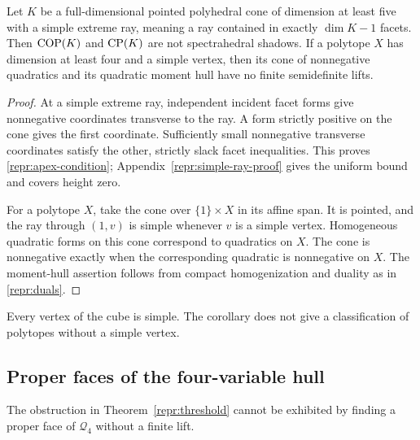 \begin{corollary}\label{repr:simple-vertex}
Let $K$ be a full-dimensional pointed polyhedral cone of dimension at least
five with a simple extreme ray, meaning a ray contained in exactly
$\dim K-1$ facets. Then $\operatorname{COP}(K)$ and $\operatorname{CP}(K)$ are not spectrahedral
shadows. If a polytope $X$ has dimension at least four and a simple vertex,
then its cone of nonnegative quadratics and its quadratic moment hull have
no finite semidefinite lifts.
\end{corollary}
\begin{proof}
At a simple extreme ray, independent incident facet forms give nonnegative
coordinates transverse to the ray. A form strictly positive on the cone
gives the first coordinate. Sufficiently small nonnegative transverse
coordinates satisfy the other, strictly slack facet inequalities. This
proves \eqref{repr:apex-condition}; Appendix~\ref{repr:simple-ray-proof}
gives the uniform bound and covers height zero.

For a polytope $X$, take the cone over $\{1\}\times X$ in its affine span.
It is pointed, and the ray through $(1,v)$ is simple whenever $v$ is a
simple vertex. Homogeneous quadratic forms on this cone correspond to
quadratics on $X$. The cone is nonnegative exactly when the corresponding
quadratic is nonnegative on $X$. The moment-hull assertion follows from
compact homogenization and duality as in \eqref{repr:duals}.
\end{proof}

Every vertex of the cube is simple. The corollary does not
give a classification of polytopes without a simple vertex.

\subsection{Proper faces of the four-variable hull}

The obstruction in Theorem~\ref{repr:threshold} cannot be exhibited by
finding a proper face of $\mathcal Q_4$ without a finite lift.

